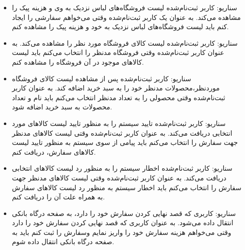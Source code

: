 \documentclass[14pt]{article}
\begin{document}
\begin{flushright}
\begin{itemize}
\item سناریو: کاربر ثبت‌نام‌شده لیست فروشگاه‌های لباس نزدیک به وی و هزینه پیک را مشاهده می‌کند.
\newline
به عنوان یک کاربر ثبت‌نام‌شده
\newline
وقتی می‌خواهم سفارشی را ایجاد کنم
\newline
باید لیست فروشگاه‌های لباس نزدیک به خود و هزینه پیک را مشاهده کنم.

\item سناریو: کاربر ثبت‌نام‌شده لیست کالای فروشگاه مورد نظر را مشاهده می‌کند.
\newline
به عنوان کاربر ثبت‌نام‌شده
\newline
وقتی فروشگاه مدنظر را انتخاب می‌کنم
\newline
باید لیست کالاهای موجود در آن فروشگاه را مشاهده کنم.

\item سناریو: کاربر ثبت‌نام‌شده پس از مشاهده لیست کالای فروشگاه موردنظر،محصولات مدنظر خود را به سبد خرید اضافه کند.
\newline
به عنوان کاربر ثبت‌نام‌شده
\newline
وقتی محصولی را به تعداد مدنظر انتخاب می‌کنم
\newline
باید نام و تعداد محصولات به سبد خرید اضافه شود.


\item سناریو: کاربر ثبت‌نام‌شده تایید سیستم را به منظور تایید لیست کالاهای مورد انتخابی دریافت می‌کند.
\newline
به عنوان کاربر ثبت‌نام‌شده
\newline
وقتی لیست کالاهای مدنظر جهت سفارش را انتخاب می‌کنم
\newline
باید پیامی از سوی سیستم به منظور تایید لیست کالاهای سفارش، دریافت کنم. 


\item سناریو: کاربر ثبت‌نام‌‌شده اخطار سیستم را به منظور رد لیست کالاهای انتخابی دریافت می‌کند.
\newline
به عنوان کاربر ثبت‌نام‌شده
\newline
وقتی لیست کالاهای  مدنظر جهت سفارش را انتخاب می‌کنم
\newline
باید اخطار سیستم به منظور رد لیست کالاهای سفارش به همراه علت آن را دریافت کنم. 


\item سناریو: کاربری که قصد نهایی کردن سفارش خود را دارد، به صفحه درگاه بانکی انتقال داده می‌شود.
\newline
به عنوان کاربری که قصد نهایی کردن سفارش خود را دارد
\newline
وقتی می‌خواهم هزینه سفارش خود را واریز نمایم وسفارش را ثبت کنم
\newline
باید به صفحه درگاه بانکی انتقال داده شوم.


\end{itemize}
\end{flushright}
\end{document}
